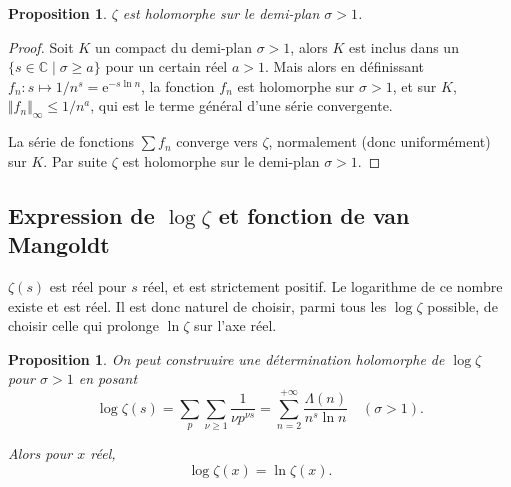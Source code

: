 \documentclass[french]{report}
\newtheorem{proposition}[theorem]{Proposition}
\begin{document}
\begin{proposition}
  $\zeta$ est holomorphe sur le demi-plan $\sigma > 1$.
\end{proposition}

\begin{proof}
  Soit $K$ un compact du demi-plan $\sigma > 1$, alors $K$ est inclus dans un $\{ s\in\mathbb{C} \mid \sigma \geq a \}$ pour un certain réel $a > 1$. Mais alors en définissant $f_n: s \mapsto 1 / n^s = \mathrm{e}^{-s\ln n}$, la fonction $f_n$ est holomorphe sur $\sigma > 1$, et sur $K$, $\Vert{f_n}\Vert_\infty \leq 1 / n^a$, qui est le terme général d'une série convergente.
  
  La série de fonctions $\sum f_n$ converge vers $\zeta$, normalement (donc uniformément) sur $K$. Par suite $\zeta$ est holomorphe sur le demi-plan $\sigma > 1$.
\end{proof}

\subsection{Expression de $\log\zeta$ et fonction de van Mangoldt}

$\zeta(s)$ est réel pour $s$ réel, et est strictement positif. Le logarithme de ce nombre existe et est réel. Il est donc naturel de choisir, parmi tous les $\log\zeta$ possible, de choisir celle qui prolonge $\ln\zeta$ sur l'axe réel.

\begin{proposition}\label{prop:log-zeta}
  On peut construuire une détermination holomorphe de $\log\zeta$ pour $\sigma>1$ en posant
  \[
    \log\zeta(s)
    = \sum_p\sum_{\nu\geq1}\frac{1}{\nu p^{\nu s}}
    = \sum_{n=2}^{+\infty}\frac{\Lambda(n)}{n^s\ln n}\quad(\sigma>1).
  \]

  Alors pour $x$ réel,
  \[ \log\zeta(x) = \ln\zeta(x). \]
\end{proposition}
\end{document}
